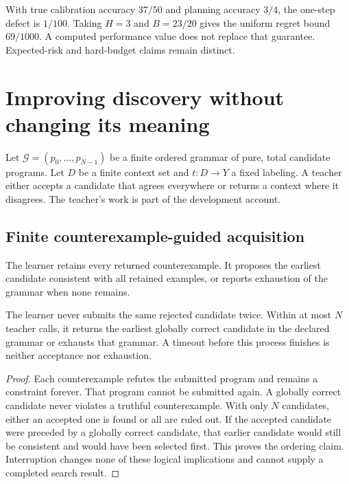 With true calibration accuracy $37/50$ and planning accuracy $3/4$, the one-step defect is $1/100$. Taking $H=3$ and $B=23/20$ gives the uniform regret bound $69/1000$. A computed performance value does not replace that guarantee. Expected-risk and hard-budget claims remain distinct.

\chapter{Improving discovery without changing its meaning}\label{ch:discovery}
Let $\mathcal G=(p_0,\ldots,p_{N-1})$ be a finite ordered grammar of pure, total candidate programs. Let $D$ be a finite context set and $t:D\to Y$ a fixed labeling. A teacher either accepts a candidate that agrees everywhere or returns a context where it disagrees. The teacher's work is part of the development account.

\section{Finite counterexample-guided acquisition}
The learner retains every returned counterexample. It proposes the earliest candidate consistent with all retained examples, or reports exhaustion of the grammar when none remains.

\begin{proposition}\label{r:cegis}
The learner never submits the same rejected candidate twice. Within at most $N$ teacher calls, it returns the earliest globally correct candidate in the declared grammar or exhausts that grammar. A timeout before this process finishes is neither acceptance nor exhaustion.
\end{proposition}
\begin{proof}
Each counterexample refutes the submitted program and remains a constraint forever. That program cannot be submitted again. A globally correct candidate never violates a truthful counterexample. With only $N$ candidates, either an accepted one is found or all are ruled out. If the accepted candidate were preceded by a globally correct candidate, that earlier candidate would still be consistent and would have been selected first. This proves the ordering claim. Interruption changes none of these logical implications and cannot supply a completed search result.
\end{proof}

